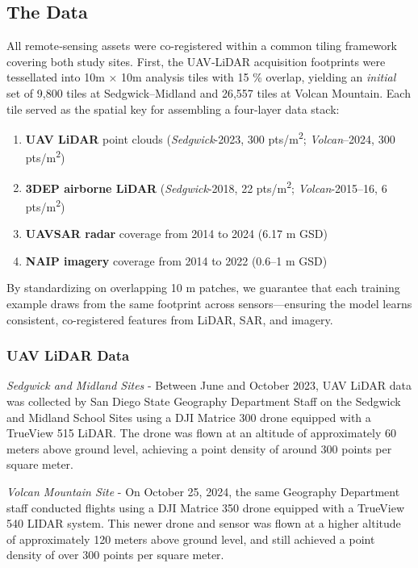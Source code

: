 \documentclass[preprint,12pt,authoryear]{elsarticle}
\begin{document}
\subsection{The Data}

All remote‐sensing assets were co-registered within a common tiling framework covering both study sites.  
First, the UAV‐LiDAR acquisition footprints were tessellated into 10m × 10m analysis tiles with 15 \% overlap, yielding an \emph{initial} set of 9,800 tiles at Sedgwick–Midland and 26,557 tiles at Volcan Mountain.  Each tile served as the spatial key for assembling a four-layer data stack:

\begin{enumerate}[leftmargin=*]
    \item \textbf{UAV LiDAR} point clouds (\textit{Sedgwick}-2023, 300 pts/m\textsuperscript{2}; \textit{Volcan}–2024, 300 pts/m\textsuperscript{2})
    \item \textbf{3DEP airborne LiDAR} (\textit{Sedgwick}-2018, 22 pts/m\textsuperscript{2}; \textit{Volcan}-2015–16, 6 pts/m\textsuperscript{2})
    \item \textbf{UAVSAR radar} coverage from 2014 to 2024 (6.17 m GSD)
    \item \textbf{NAIP imagery} coverage from 2014 to 2022 (0.6–1 m GSD)
\end{enumerate}

By standardizing on overlapping 10 m patches, we guarantee that each training example draws from the same footprint across sensors—ensuring the model learns consistent, co-registered features from LiDAR, SAR, and imagery.

\subsubsection{UAV LiDAR Data}
\textit{Sedgwick and Midland Sites} - Between June and October 2023, UAV LiDAR data was collected by San Diego State Geography Department Staff on the Sedgwick and Midland School Sites using a DJI Matrice 300 drone equipped with a TrueView 515 LiDAR. The drone was flown at an altitude of approximately 60 meters above ground level, achieving a point density of around 300 points per square meter. 

\textit{Volcan Mountain Site} - On October 25, 2024, the same Geography Department staff conducted flights using a  DJI Matrice 350 drone equipped with a TrueView 540 LIDAR system. This newer drone and sensor was flown at a higher altitude of approximately 120 meters above ground level, and still achieved a point density of over 300 points per square meter.
\end{document}
